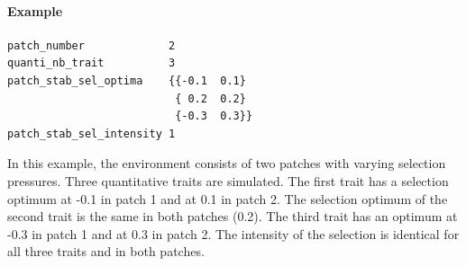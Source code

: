 \documentclass[letterpaper,12pt,oneside]{book}
\begin{document}
\begin{appendices}
\paragraph{Example}\hspace*{\fill}
\begin{lstlisting}[frame=single]
patch_number             2
quanti_nb_trait          3
patch_stab_sel_optima    {{-0.1  0.1}                            
                          { 0.2  0.2}
                          {-0.3  0.3}}    
patch_stab_sel_intensity 1                                                    
\end{lstlisting}
In this example, the environment consists of two patches with varying selection pressures. Three quantitative traits are simulated. The first trait has a selection optimum at -0.1 in patch 1 and at 0.1 in patch 2. The selection optimum of the second trait is the same in both patches (0.2). The third trait has an optimum at -0.3 in patch 1 and at 0.3 in patch 2. The intensity of the selection is identical for all three traits and in both patches.    

\end{appendices}
\end{document}
